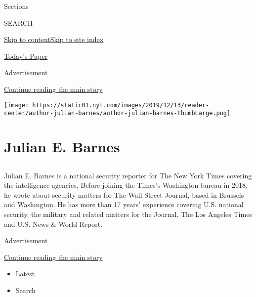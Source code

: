 Sections

SEARCH

\protect\hyperlink{site-content}{Skip to
content}\protect\hyperlink{site-index}{Skip to site index}

\href{https://myaccount.nytimes.com/auth/login?response_type=cookie\&client_id=vi}{}

\href{https://www.nytimes.com/section/todayspaper}{Today's Paper}

Advertisement

\protect\hyperlink{after-top}{Continue reading the main story}

\texttt{[image: https://static01.nyt.com/images/2019/12/13/reader-center/author-julian-barnes/author-julian-barnes-thumbLarge.png]}

\hypertarget{julian-e-barnes}{%
\section{Julian E. Barnes}\label{julian-e-barnes}}

\hypertarget{section}{%
\subsection{}\label{section}}

Julian E. Barnes is a national security reporter for The New York Times
covering the intelligence agencies. Before joining the Times's
Washington bureau in 2018, he wrote about security matters for The Wall
Street Journal, based in Brussels and Washington. He has more than 17
years' experience covering U.S. national security, the military and
related matters for the Journal, The Los Angeles Times and U.S. News \&
World Report.

Advertisement

\protect\hyperlink{after-mid1}{Continue reading the main story}

\begin{itemize}
\tightlist
\item
  \protect\hyperlink{stream-panel}{Latest}
\item
  Search
\end{itemize}

